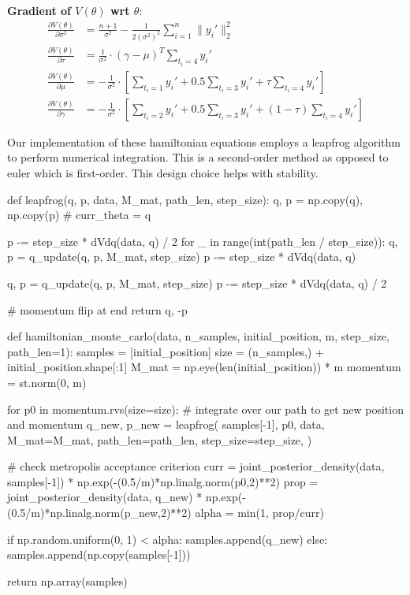 \documentclass[12pt,letterpaper,twoside]{article}
\begin{document}
\textbf{Gradient of $V(\theta)$ wrt $\theta$}: 
\begin{align*}
    \frac{\partial V(\theta)}{\partial \sigma^2} & = \frac{n+1}{\sigma^2} - \frac{1}{2(\sigma^2)^2}\sum_{i=1}^n \|y_i'\|^2_2 \\
    \frac{\partial V(\theta)}{\partial \tau} & = \frac{1}{\sigma^2} \cdot (\gamma - \mu)^T \sum_{t_i=4} y_i' \\
    \frac{\partial V(\theta)}{\partial \mu} & = - \frac{1}{\sigma^2} \cdot \left[\sum_{t_i=1} y_i' + 0.5\sum_{t_i=3} y_i' + \tau\sum_{t_i=4} y_i'\right]\\
    \frac{\partial V(\theta)}{\partial \gamma} & = - \frac{1}{\sigma^2} \cdot \left[\sum_{t_i=2} y_i' + 0.5\sum_{t_i=3} y_i' + (1-\tau)\sum_{t_i=4} y_i'\right]
\end{align*}

Our implementation of these hamiltonian equations employs a 
leapfrog algorithm to perform numerical integration. This is 
a second-order method as opposed to euler which is first-order. 
This design choice helps with stability.
\begin{python}
def leapfrog(q, p, data, M_mat, path_len, step_size):
    q, p = np.copy(q), np.copy(p)  # curr_theta = q

    p -= step_size * dVdq(data, q) / 2
    for _ in range(int(path_len / step_size)):
        q, p = q_update(q, p, M_mat, step_size)
        p -= step_size * dVdq(data, q)

    q, p = q_update(q, p, M_mat, step_size)
    p -= step_size * dVdq(data, q) / 2

    # momentum flip at end
    return q, -p

def hamiltonian_monte_carlo(data, n_samples, initial_position, m, step_size, path_len=1):
    samples = [initial_position]
    size = (n_samples,) + initial_position.shape[:1]
    M_mat = np.eye(len(initial_position)) * m
    momentum = st.norm(0, m)

    for p0 in momentum.rvs(size=size):
        # integrate over our path to get new position and momentum
        q_new, p_new = leapfrog(
            samples[-1],
            p0,
            data,
            M_mat=M_mat,
            path_len=path_len,
            step_size=step_size,
        )

        # check metropolis acceptance criterion
        curr = joint_posterior_density(data, samples[-1]) * np.exp(-(0.5/m)*np.linalg.norm(p0,2)**2)
        prop = joint_posterior_density(data, q_new) * np.exp(-(0.5/m)*np.linalg.norm(p_new,2)**2)
        alpha = min(1, prop/curr)

        if np.random.uniform(0, 1) < alpha:
            samples.append(q_new)
        else:
            samples.append(np.copy(samples[-1]))

    return np.array(samples)
\end{python}
\end{document}
